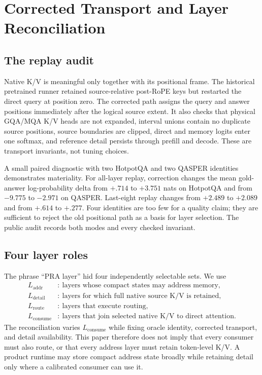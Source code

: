 \documentclass[11pt]{article}
\begin{document}
\section{Corrected Transport and Layer Reconciliation}
\label{sec:layer-reconciliation}

\subsection{The replay audit}

Native K/V is meaningful only together with its positional frame.  The historical pretrained
runner retained source-relative post-RoPE keys but restarted the direct query at position zero.
The corrected path assigns the query and answer positions immediately after the logical source
extent.  It also checks that physical GQA/MQA K/V heads are not expanded, interval unions contain
no duplicate source positions, source boundaries are clipped, direct and memory logits enter one
softmax, and reference detail persists through prefill and decode.  These are transport
invariants, not tuning choices.

A small paired diagnostic with two HotpotQA and two QASPER identities demonstrates materiality.
For all-layer replay, correction changes the mean gold-answer log-probability delta from $+.714$
to $+3.751$ nats on HotpotQA and from $-9.775$ to $-2.971$ on QASPER.  Last-eight replay changes
from $+2.489$ to $+2.089$ and from $+.614$ to $+.277$.  Four identities are too few for a quality
claim; they are sufficient to reject the old positional path as a basis for layer selection.  The
public audit records both modes and every checked invariant.

\subsection{Four layer roles}

The phrase ``PRA layer'' hid four independently selectable sets.  We use
\begin{align}
L_{\mathrm{addr}} &:\ \text{layers whose compact states may address memory},\\
L_{\mathrm{detail}} &:\ \text{layers for which full native source K/V is retained},\\
L_{\mathrm{route}} &:\ \text{layers that execute routing},\\
L_{\mathrm{consume}} &:\ \text{layers that join selected native K/V to direct attention}.
\end{align}
The reconciliation varies $L_{\mathrm{consume}}$ while fixing oracle identity, corrected
transport, and detail availability.  This paper therefore does not imply that every consumer must
also route, or that every address layer must retain token-level K/V.  A product runtime may store
compact address state broadly while retaining detail only where a calibrated consumer can use it.
\end{document}
